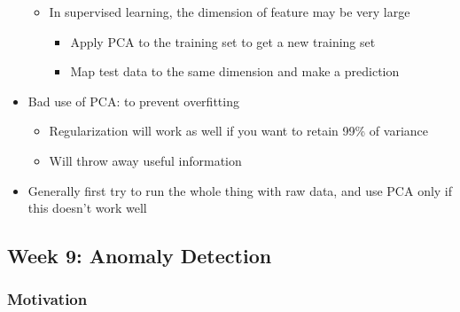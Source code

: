 \documentclass[]{article}
\providecommand{\tightlist}{%
  \setlength{\itemsep}{0pt}\setlength{\parskip}{0pt}}
\begin{document}
\begin{itemize}
  \begin{itemize}
  \tightlist
  \item
    In supervised learning, the dimension of feature may be very large

    \begin{itemize}
    \tightlist
    \item
      Apply PCA to the training set to get a new training set
    \item
      Map test data to the same dimension and make a prediction
    \end{itemize}
  \end{itemize}
\item
  Bad use of PCA: to prevent overfitting

  \begin{itemize}
  \tightlist
  \item
    Regularization will work as well if you want to retain 99\% of
    variance
  \item
    Will throw away useful information
  \end{itemize}
\item
  Generally first try to run the whole thing with raw data, and use PCA
  only if this doesn't work well
\end{itemize}

\hypertarget{week-9-anomaly-detection}{%
\subsection{Week 9: Anomaly Detection}\label{week-9-anomaly-detection}}

\hypertarget{motivation-1}{%
\subsubsection{Motivation}\label{motivation-1}}
\end{document}
